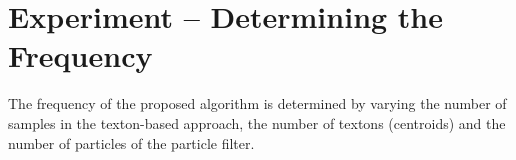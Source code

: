 
\section{Experiment -- Determining the Frequency}

The frequency of the proposed algorithm is determined by varying the number of samples in the texton-based approach, the number of textons (centroids) and the number of particles of the particle filter.